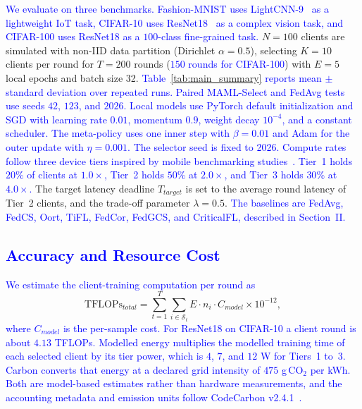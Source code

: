 \documentclass[journal]{IEEEtran}
\newcommand{\revision}[1]{\textcolor{blue}{#1}}
\begin{document}
\revision{We evaluate on three benchmarks. Fashion-MNIST uses LightCNN-9~\cite{wu2018light} as a lightweight IoT task, CIFAR-10 uses ResNet18~\cite{he2016deep} as a complex vision task, and CIFAR-100 uses ResNet18 as a $100$-class fine-grained task.} $N = 100$ clients are simulated with non-IID data partition (Dirichlet $\alpha = 0.5$), selecting $K = 10$ clients per round for $T = 200$ rounds (\revision{$150$ rounds for CIFAR-100}) with $E = 5$ local epochs and batch size 32. \revision{Table~\ref{tab:main_summary} reports mean $\pm$ standard deviation over repeated runs. Paired MAML-Select and FedAvg tests use seeds $42$, $123$, and $2026$.} \revision{Local models use PyTorch default initialization and SGD with learning rate $0.01$, momentum $0.9$, weight decay $10^{-4}$, and a constant scheduler. The meta-policy uses one inner step with $\beta=0.01$ and Adam for the outer update with $\eta=0.001$. The selector seed is fixed to 2026.} \revision{Compute rates follow three device tiers inspired by mobile benchmarking studies~\cite{ignatov2018ai}. Tier~1 holds $20\%$ of clients at $1.0\times$, Tier~2 holds $50\%$ at $2.0\times$, and Tier~3 holds $30\%$ at $4.0\times$.} The target latency deadline $T_{target}$ is set to the average round latency of Tier~2 clients, and the trade-off parameter $\lambda = 0.5$. \revision{The baselines are FedAvg, FedCS, Oort, TiFL, FedCor, FedGCS, and CriticalFL, described in Section~II.}

\subsection{\revision{Accuracy and Resource Cost}}
\revision{We estimate the client-training computation per round as}
\begin{equation}
	\text{TFLOPs}_{total} = \sum_{t=1}^{T} \sum_{i \in \mathcal{S}_t} E \cdot n_i \cdot C_{model} \times 10^{-12},
	\label{eq:tflops}
\end{equation}
\revision{where $C_{model}$ is the per-sample cost. For ResNet18 on CIFAR-10 a client round is about $4.13$ TFLOPs. Modelled energy multiplies the modelled training time of each selected client by its tier power, which is $4$, $7$, and $12$ W for Tiers~1 to~3. Carbon converts that energy at a declared grid intensity of $475$ g\,CO$_2$ per kWh. Both are model-based estimates rather than hardware measurements, and the accounting metadata and emission units follow CodeCarbon v2.4.1~\cite{courty2024codecarbon}.}
\end{document}
